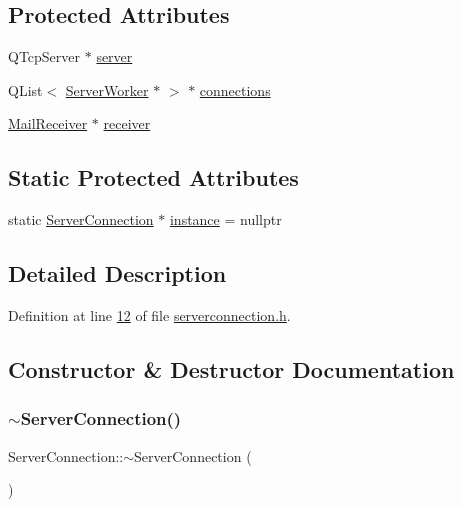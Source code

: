 \subsection*{Protected Attributes}
\begin{DoxyCompactItemize}
\item 
Q\+Tcp\+Server $\ast$ \hyperlink{a00181_aee9a8e6c0f1d25fc2fcb4662631c0c74}{server}
\item 
Q\+List$<$ \hyperlink{a00185}{Server\+Worker} $\ast$ $>$ $\ast$ \hyperlink{a00181_a7d9e1b1ac7c2d57b439ab5918e7c31d0}{connections}
\item 
\hyperlink{a00197}{Mail\+Receiver} $\ast$ \hyperlink{a00205_aa57ce2f74f8ad76abb38974f85b97ac5}{receiver}
\end{DoxyCompactItemize}
\subsection*{Static Protected Attributes}
\begin{DoxyCompactItemize}
\item 
static \hyperlink{a00181}{Server\+Connection} $\ast$ \hyperlink{a00181_adbbe8ffe6ee71b0aee4db9b6e689ba2a}{instance} = nullptr
\end{DoxyCompactItemize}


\subsection{Detailed Description}


Definition at line \hyperlink{a00104_source_l00012}{12} of file \hyperlink{a00104_source}{serverconnection.\+h}.



\subsection{Constructor \& Destructor Documentation}
\mbox{\label{a00181_af919491d0e2ff066b0a58cc50fc0d90d}} 
\subsubsection{\texorpdfstring{$\sim$\+Server\+Connection()}{~ServerConnection()}}
{\footnotesize\ttfamily Server\+Connection\+::$\sim$\+Server\+Connection (\begin{DoxyParamCaption}{ }\end{DoxyParamCaption})}



